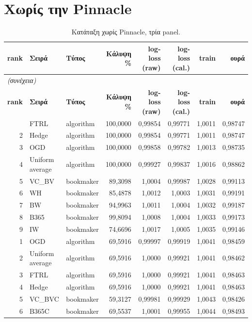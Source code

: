 \section{Χωρίς την Pinnacle}
{\scriptsize
\begin{longtable}{@{}rllrrrrr@{}}
\caption{Κατάταξη χωρίς Pinnacle, τρία panel.}\label{app:np}\\
\toprule \textbf{rank} & \textbf{Σειρά} & \textbf{Τύπος} & \textbf{Κάλυψη \%} & \textbf{log-loss (raw)} & \textbf{log-loss (cal.)} & \textbf{train} & \textbf{ουρά} \\\midrule\endfirsthead
\multicolumn{8}{l}{\emph{(συνέχεια)}}\\\toprule \textbf{rank} & \textbf{Σειρά} & \textbf{Τύπος} & \textbf{Κάλυψη \%} & \textbf{log-loss (raw)} & \textbf{log-loss (cal.)} & \textbf{train} & \textbf{ουρά} \\\midrule\endhead
\bottomrule\endfoot
1 & FTRL & algorithm & 100,0000 & 0,99854 & 0,99771 & 1,0011 & 0,98747 \\
2 & Hedge & algorithm & 100,0000 & 0,99854 & 0,99771 & 1,0011 & 0,98747 \\
3 & OGD & algorithm & 100,0000 & 0,99858 & 0,99782 & 1,0013 & 0,98735 \\
4 & Uniform average & algorithm & 100,0000 & 0,99927 & 0,99837 & 1,0016 & 0,98862 \\
5 & VC\_BV & bookmaker & 89,3098 & 1,0004 & 0,99987 & 1,0028 & 0,99113 \\
6 & WH & bookmaker & 85,4878 & 1,0012 & 1,0003 & 1,0031 & 0,99191 \\
7 & BW & bookmaker & 94,9963 & 1,0011 & 1,0004 & 1,0032 & 0,99187 \\
8 & B365 & bookmaker & 99,8094 & 1,0008 & 1,0004 & 1,0033 & 0,99173 \\
9 & IW & bookmaker & 74,6696 & 1,0017 & 1,0005 & 1,0035 & 0,99146 \\
1 & OGD & algorithm & 69,5916 & 0,99997 & 0,99919 & 1,0041 & 0,98459 \\
2 & Uniform average & algorithm & 69,5916 & 1,0000 & 0,99921 & 1,0041 & 0,98462 \\
3 & FTRL & algorithm & 69,5916 & 1,0000 & 0,99921 & 1,0041 & 0,98463 \\
4 & Hedge & algorithm & 69,5916 & 1,0000 & 0,99921 & 1,0041 & 0,98463 \\
5 & VC\_BVC & bookmaker & 59,3127 & 0,99981 & 0,99929 & 1,0043 & 0,98426 \\
6 & B365C & bookmaker & 69,5537 & 1,0001 & 0,99955 & 1,0044 & 0,98493 \\

\end{longtable}}
